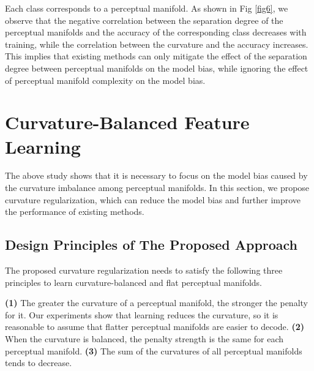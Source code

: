 \documentclass[10pt,twocolumn,letterpaper]{article}
\begin{document}
Each class corresponds to a perceptual manifold. As shown in Fig \ref{fig6}, we observe that the negative correlation between the separation degree of the perceptual manifolds and the accuracy of the corresponding class decreases with training, while the correlation between the curvature and the accuracy increases. This implies that existing methods can only mitigate the effect of the separation degree between perceptual manifolds on the model bias, while ignoring the effect of perceptual manifold complexity on the model bias.

\section{Curvature-Balanced Feature Learning}
\label{sec5}


The above study shows that it is necessary to focus on the model bias caused by the curvature imbalance among perceptual manifolds. In this section, we propose curvature regularization, which can reduce the model bias and further improve the performance of existing methods.

\subsection{Design Principles of The Proposed Approach}
\label{sec5.1}

The proposed curvature regularization needs to satisfy the following three principles to learn curvature-balanced and flat perceptual manifolds.

\textbf{(1)} The greater the curvature of a perceptual manifold, the stronger the penalty for it. Our experiments show that learning reduces the curvature, so it is reasonable to assume that flatter perceptual manifolds are easier to decode.
\textbf{(2)} When the curvature is balanced, the penalty strength is the same for each perceptual manifold.
\textbf{(3)} The sum of the curvatures of all perceptual manifolds tends to decrease.


\iffalse
\begin{itemize}
    \item The greater the curvature of a perceptual manifold, the stronger the penalty for it.
    \item When the curvature is balanced, the penalty strength is the same for each perceptual manifold.
     \item The sum of the curvatures of all perceptual manifolds tends to decrease.
\end{itemize}
\fi
\end{document}
